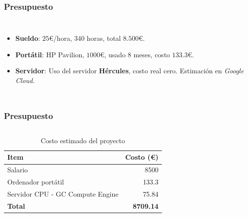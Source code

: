 \begin{frame}
    \frametitle{Presupuesto}
    \begin{columns}
        \begin{itemize}
            \item \textbf{Sueldo}: $25$€/hora, $340$ horas, total $8.500$€.
            \item \textbf{Portátil}: HP Pavilion, $1000$€, usado $8$ meses, costo $133.3$€.
            \item \textbf{Servidor}: Uso del servidor \textbf{Hércules}, costo real cero. Estimación en \textit{Google Cloud}.
        \end{itemize}
    \end{columns}
\end{frame}

\note{

}

\begin{frame}
    \frametitle{Presupuesto}
    \begin{columns}
        \begin{table}[htp]
            \centering
            \begin{tabular}{|l|r|}
                \hline
                \textbf{Item}                    & \textbf{Costo (€)} \\ \hline
                Salario                          & 8500               \\
                Ordenador portátil               & 133.3              \\
                Servidor CPU - GC Compute Engine & 75.84              \\
                \textbf{Total}                   & \textbf{8709.14}   \\ \hline
            \end{tabular}
            \caption{Costo estimado del proyecto}
        \end{table}
    \end{columns}
\end{frame}